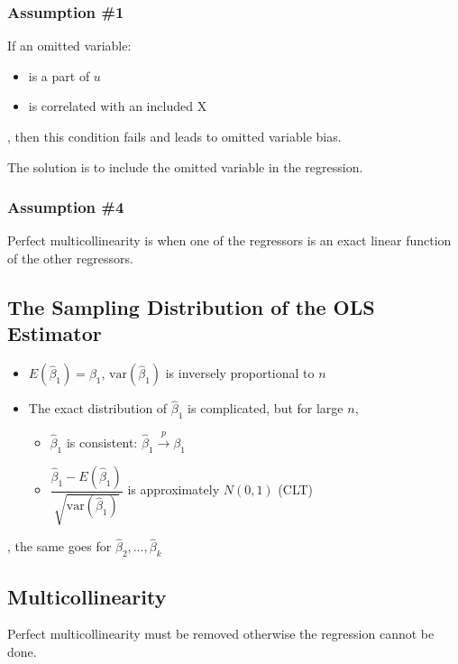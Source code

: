 \documentclass{article}
\begin{document}
\subsubsection{Assumption \#1}

If an omitted variable:
\begin{itemize}
	\item is a part of $u$
	\item is correlated with an included X
\end{itemize}
, then this condition fails and leads to omitted variable bias.

The solution is to include the omitted variable in the regression.

\subsubsection{Assumption \#4}

Perfect multicollinearity is when one of the regressors is an exact linear function of the other regressors.

\subsection{The Sampling Distribution of the OLS Estimator}

\begin{itemize}
	\item $E(\hat{\beta}_1) = \beta_1$, $\text{var}(\hat{\beta}_1)$ is inversely proportional to $n$
	\item The exact distribution of $\hat{\beta}_1$ is complicated, but for large $n$,
	      \begin{itemize}
		      \item $\hat{\beta}_1$ is consistent: $\hat{\beta}_1 \xrightarrow{p} \beta_1$
		      \item $\dfrac{\hat{\beta}_1 - E(\hat{\beta}_1)}{\sqrt{\text{var}(\hat{\beta}_1)}}$ is approximately $N(0,1)$ (CLT)
	      \end{itemize}
\end{itemize}
, the same goes for $\hat{\beta}_2, \ldots, \hat{\beta}_k$

\subsection{Multicollinearity}

Perfect multicollinearity must be removed otherwise the regression cannot be done.
\end{document}
